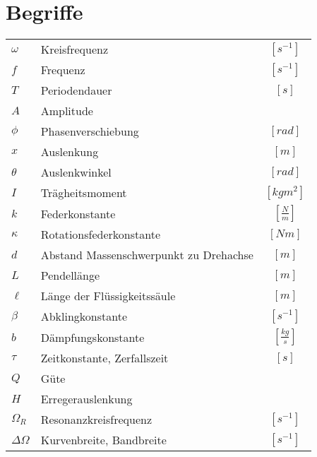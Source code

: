 \section{Begriffe}
\begin{table}[h!]
\renewcommand{\arraystretch}{1.5}
\begin{tabular}{p{} l c}
$\omega$       & Kreisfrequenz 			& $[s^{-1}]$ \\
$f$            & Frequenz 			& $[s^{-1}]$ \\
$T$            & Periodendauer 			& $[s]$ \\
$A$            & Amplitude 			&  \\
$\phi$         & Phasenverschiebung 		& $[rad]$\\
$x$            & Auslenkung 			& $[m]$ \\
$\theta$       & Auslenkwinkel 			& $[rad]$ \\
$I$            & Trägheitsmoment 		& $[kg m^2]$ \\
$k$            & Federkonstante 		& $[\frac{N}{m}]$ \\
$\kappa$       & Rotationsfederkonstante 	& $[Nm]$ \\
$d$            & Abstand Massenschwerpunkt 
		 zu Drehachse 			& $[m]$ \\
$L$            & Pendellänge 			& $[m]$ \\
$\ell$         & Länge der Flüssigkeitssäule 	& $[m]$ \\
$\beta$        & Abklingkonstante 		& $[s^{-1}]$ \\
$b$            & Dämpfungskonstante 		& $[\frac{kg}{s}]$ \\
$\tau$         & Zeitkonstante, Zerfallszeit 	& $[s]$ \\
$Q$            & Güte 				& \\
$H$            & Erregerauslenkung 		& \\
$\Omega_R$     & Resonanzkreisfrequenz 		& $[s^{-1}]$ \\
$\Delta\Omega$ & Kurvenbreite, Bandbreite 	& $[s^{-1}]$ \\
\end{tabular}
\end{table}
